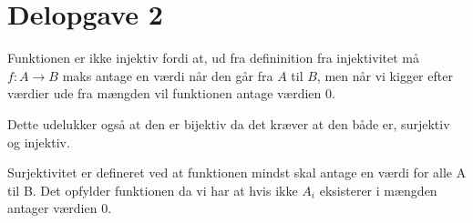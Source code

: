 \section{Delopgave 2}\label{sec:delopgave-22}

Funktionen er ikke injektiv fordi at, ud fra defininition fra injektivitet må \( f: A \rightarrow B \) maks antage en
værdi når den går fra \(A\) til \(B\), men når vi kigger efter værdier ude fra mængden vil funktionen antage værdien
\(0\).

Dette udelukker også at den er bijektiv da det kræver at den både er, surjektiv og injektiv.

Surjektivitet er defineret ved at funktionen mindst skal antage en værdi for alle A til B\@.
Det opfylder funktionen da vi har at hvis ikke \(A_{i}\) eksisterer i mængden antager værdien \(0\).

